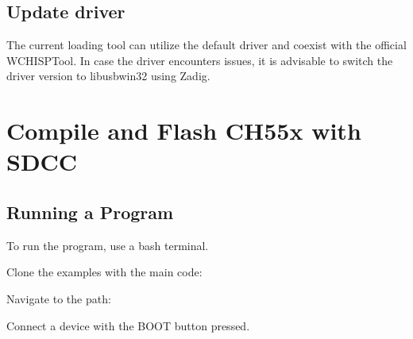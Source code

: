 \documentclass[letterpaper,10pt,english]{sphinxmanual}
\begin{document}
\section{Update driver}
\label{\detokenize{install_windows:update-driver}}
\sphinxAtStartPar
The current loading tool can utilize the default driver and coexist with the official WCHISPTool. In case the driver encounters issues, it is advisable to switch the driver version to libusb\sphinxhyphen{}win32 using Zadig.


\sphinxstepscope


\chapter{Compile and Flash CH55x with SDCC}
\label{\detokenize{compile:compile-and-flash-ch55x-with-sdcc}}\label{\detokenize{compile::doc}}

\section{Running a Program}
\label{\detokenize{compile:running-a-program}}
\sphinxAtStartPar
To run the program, use a bash terminal.

\sphinxAtStartPar
Clone the examples with the main code:

\begin{sphinxVerbatim}[commandchars=\\\{\}]
  
\end{sphinxVerbatim}

\sphinxAtStartPar
Navigate to the path:

\begin{sphinxVerbatim}[commandchars=\\\{\}]
 
\end{sphinxVerbatim}

\sphinxAtStartPar
Connect a device with the BOOT button pressed.
\end{document}
